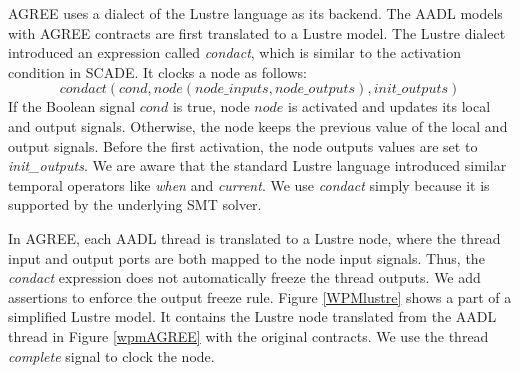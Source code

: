 
AGREE uses a dialect \cite{GAO2008111} of the Lustre language as its backend. The AADL models with AGREE contracts are first translated to a Lustre model. The Lustre dialect introduced an expression called \emph{condact}, which is similar to the activation condition in SCADE.
It clocks a node as follows: 
\begin{equation*}
condact (cond, node(node\_inputs, node\_outputs), init\_outputs)
\end{equation*}
If the Boolean signal $cond$ is true, node $node$ is activated and updates its local and output signals. Otherwise, the node keeps the previous value of the local and output signals. Before the first activation, the node outputs values are set to \emph{init\_outputs}. %
We are aware that the standard Lustre language introduced similar temporal operators like \emph{when} and \emph{current}. We use \emph{condact} simply because it is supported by the underlying SMT solver.

In AGREE, each AADL thread is translated to a Lustre node, where the thread input and output ports are both mapped to the node input signals. Thus, the \emph{condact} expression does not automatically freeze the thread outputs. We add assertions to enforce the output freeze rule. Figure \ref{WPMlustre} shows a part of a simplified Lustre model. It contains the Lustre node translated from the AADL thread in Figure \ref{wpmAGREE} with the original contracts. We use the thread \emph{complete} signal to clock the node.

